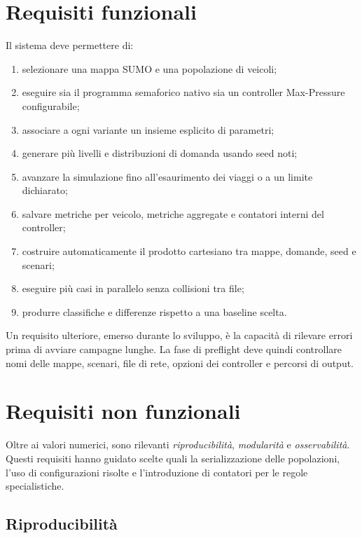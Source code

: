 \documentclass[12pt,a4paper,oneside]{report}
\numberwithin{equation}{chapter}
\begin{document}
\section{Requisiti funzionali}

Il sistema deve permettere di:

\begin{enumerate}
    \item selezionare una mappa SUMO e una popolazione di veicoli;
    \item eseguire sia il programma semaforico nativo sia un controller
    Max-Pressure configurabile;
    \item associare a ogni variante un insieme esplicito di parametri;
    \item generare più livelli e distribuzioni di domanda usando seed noti;
    \item avanzare la simulazione fino all'esaurimento dei viaggi o a un limite
    dichiarato;
    \item salvare metriche per veicolo, metriche aggregate e contatori interni
    del controller;
    \item costruire automaticamente il prodotto cartesiano tra mappe, domande,
    seed e scenari;
    \item eseguire più casi in parallelo senza collisioni tra file;
    \item produrre classifiche e differenze rispetto a una baseline scelta.
\end{enumerate}

Un requisito ulteriore, emerso durante lo sviluppo, è la capacità di rilevare
errori prima di avviare campagne lunghe. La fase di preflight deve quindi
controllare nomi delle mappe, scenari, file di rete, opzioni dei controller e
percorsi di output.

\section{Requisiti non funzionali}

Oltre ai valori numerici, sono rilevanti \emph{riproducibilità},
\emph{modularità} e \emph{osservabilità}. Questi requisiti hanno guidato
scelte quali la serializzazione
delle popolazioni, l'uso di configurazioni risolte e l'introduzione di contatori
per le regole specialistiche.

\subsection{Riproducibilità}
\end{document}
